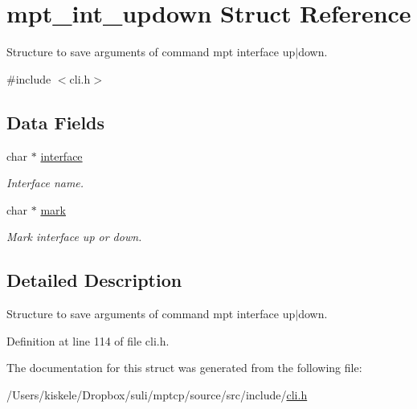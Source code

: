 \hypertarget{structmpt__int__updown}{\section{mpt\-\_\-int\-\_\-updown Struct Reference}
\label{structmpt__int__updown}
}


Structure to save arguments of command mpt interface up$|$down.  




{\ttfamily \#include $<$cli.\-h$>$}

\subsection*{Data Fields}
\begin{DoxyCompactItemize}
\item 
\hypertarget{structmpt__int__updown_af663a7576d2f8f288bb3996381484cd3}{char $\ast$ \hyperlink{structmpt__int__updown_af663a7576d2f8f288bb3996381484cd3}{interface}}\label{structmpt__int__updown_af663a7576d2f8f288bb3996381484cd3}

\begin{DoxyCompactList}\small\item\em Interface name. \end{DoxyCompactList}\item 
\hypertarget{structmpt__int__updown_af34a496b61ba99953cf618a41fc44b0b}{char $\ast$ \hyperlink{structmpt__int__updown_af34a496b61ba99953cf618a41fc44b0b}{mark}}\label{structmpt__int__updown_af34a496b61ba99953cf618a41fc44b0b}

\begin{DoxyCompactList}\small\item\em Mark interface up or down. \end{DoxyCompactList}\end{DoxyCompactItemize}


\subsection{Detailed Description}
Structure to save arguments of command mpt interface up$|$down. 

Definition at line 114 of file cli.\-h.



The documentation for this struct was generated from the following file\-:\begin{DoxyCompactItemize}
\item 
/\-Users/kiskele/\-Dropbox/suli/mptcp/source/src/include/\hyperlink{cli_8h}{cli.\-h}\end{DoxyCompactItemize}
